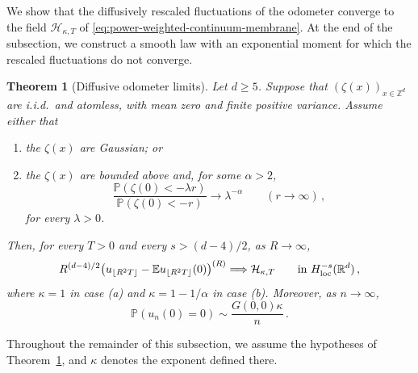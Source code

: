 \documentclass[11pt]{amsart}
\theoremstyle{plain}
\newtheorem{theorem}{Theorem}[section]
\theoremstyle{definition}
\newcommand{\Z}{\mathbb{Z}}
\newcommand{\R}{\mathbb{R}}
\newcommand{\E}{\mathbb{E}}
\renewcommand{\P}{\mathbb{P}}
\begin{document}
	We show that the diffusively rescaled fluctuations of the odometer converge
	to the field $\mathcal H_{\kappa,T}$ of
	\eqref{eq:power-weighted-continuum-membrane}.
	At the end of the subsection, we construct a smooth law with an
	exponential moment for which the rescaled fluctuations do not converge.

\begin{theorem}[Diffusive odometer limits]\label{thm:dgt4-diffusive-membrane}
	Let $d\geq5$. Suppose that $(\zeta(x))_{x\in\Z^d}$ are i.i.d.\ and
	atomless, with mean
	zero and finite positive variance. Assume either that
	\begin{enumerate}[label=\textup{(\alph*)}]
		\item the $\zeta(x)$ are Gaussian; or
		\item the $\zeta(x)$ are bounded above and, for some $\alpha>2$,
		\[
			\frac{\P(\zeta(0)<-\lambda r)}{\P(\zeta(0)<-r)}
			\longrightarrow\lambda^{-\alpha}
			\qquad(r\to\infty)\, ,
		\]
		for every $\lambda>0$.
	\end{enumerate}
	Then, for every $T>0$ and every $s>(d-4)/2$, as $R\to\infty$,
	\[
		R^{(d-4)/2}\bigl(u_{\lfloor R^2T\rfloor}-\E u_{\lfloor R^2T\rfloor}(0)\bigr)^{(R)}\Longrightarrow\mathcal H_{\kappa,T}\qquad\text{in }H^{-s}_{\rm loc}(\R^d)\, ,
	\]
	where $\kappa=1$ in case \textup{(a)} and $\kappa=1-1/\alpha$ in case
	\textup{(b)}. Moreover, as $n\to\infty$,
	\[
		\P(u_n(0)=0)\sim\frac{G(0,0)\kappa}{n}\, .
	\]
\end{theorem}

	Throughout the remainder of this subsection, we assume the hypotheses of
	Theorem~\ref{thm:dgt4-diffusive-membrane}, and $\kappa$ denotes the exponent
	defined there.
\end{document}
